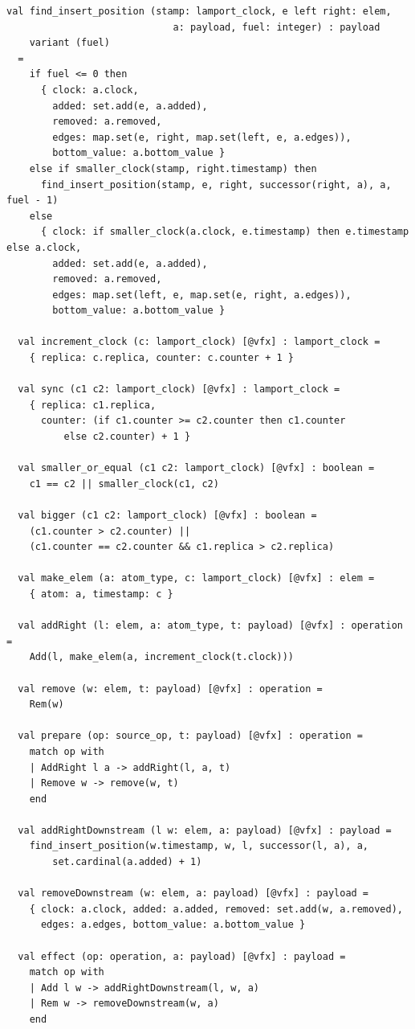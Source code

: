 \begin{lstlisting}[caption={\texttt{RGA}}, label={lst:app_rga}]
  val find_insert_position (stamp: lamport_clock, e left right: elem,
                             a: payload, fuel: integer) : payload
    variant (fuel)
  =
    if fuel <= 0 then
      { clock: a.clock,
        added: set.add(e, a.added),
        removed: a.removed,
        edges: map.set(e, right, map.set(left, e, a.edges)),
        bottom_value: a.bottom_value }
    else if smaller_clock(stamp, right.timestamp) then
      find_insert_position(stamp, e, right, successor(right, a), a, fuel - 1)
    else
      { clock: if smaller_clock(a.clock, e.timestamp) then e.timestamp else a.clock,
        added: set.add(e, a.added),
        removed: a.removed,
        edges: map.set(left, e, map.set(e, right, a.edges)),
        bottom_value: a.bottom_value }

  val increment_clock (c: lamport_clock) [@vfx] : lamport_clock =
    { replica: c.replica, counter: c.counter + 1 }

  val sync (c1 c2: lamport_clock) [@vfx] : lamport_clock =
    { replica: c1.replica,
      counter: (if c1.counter >= c2.counter then c1.counter
          else c2.counter) + 1 }

  val smaller_or_equal (c1 c2: lamport_clock) [@vfx] : boolean =
    c1 == c2 || smaller_clock(c1, c2)

  val bigger (c1 c2: lamport_clock) [@vfx] : boolean =
    (c1.counter > c2.counter) ||
    (c1.counter == c2.counter && c1.replica > c2.replica)

  val make_elem (a: atom_type, c: lamport_clock) [@vfx] : elem =
    { atom: a, timestamp: c }

  val addRight (l: elem, a: atom_type, t: payload) [@vfx] : operation =
    Add(l, make_elem(a, increment_clock(t.clock)))

  val remove (w: elem, t: payload) [@vfx] : operation =
    Rem(w)

  val prepare (op: source_op, t: payload) [@vfx] : operation =
    match op with
    | AddRight l a -> addRight(l, a, t)
    | Remove w -> remove(w, t)
    end

  val addRightDownstream (l w: elem, a: payload) [@vfx] : payload =
    find_insert_position(w.timestamp, w, l, successor(l, a), a,
        set.cardinal(a.added) + 1)

  val removeDownstream (w: elem, a: payload) [@vfx] : payload =
    { clock: a.clock, added: a.added, removed: set.add(w, a.removed),
      edges: a.edges, bottom_value: a.bottom_value }

  val effect (op: operation, a: payload) [@vfx] : payload =
    match op with
    | Add l w -> addRightDownstream(l, w, a)
    | Rem w -> removeDownstream(w, a)
    end


\end{lstlisting}
